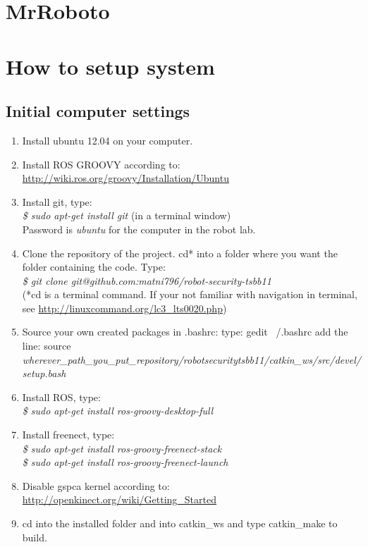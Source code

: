 \documentclass[10pt,a4paper]{article}
\begin{document}
\section*{MrRoboto}

\section{How to setup system}

\subsection{Initial computer settings}

\begin{enumerate}
\item Install ubuntu 12.04 on your computer.
\item Install ROS GROOVY according to: \url{http://wiki.ros.org/groovy/Installation/Ubuntu}
\item Install git, type:\\
\textit{
\$ sudo apt-get install git} (in a terminal window)\\
Password is \textit{ubuntu} for the computer in the robot lab.
\item Clone the repository of the project.
cd* into a folder where you want the folder containing the code.
Type:\\
\textit{\$ git clone git@github.com:matni796/robot-security-tsbb11}\\
(*cd is a terminal command. If your not familiar with navigation in terminal, see \url{http://linuxcommand.org/lc3\_lts0020.php})

\item Source your own created packages in .bashrc:
	type: gedit ~/.bashrc
add the line:
source \textit{wherever\_path\_you\_put\_repository/robot\-security\-tsbb11/catkin\_ws/src/devel/setup.bash}

\item Install ROS, type: \\
\textit{\$ sudo apt-get install ros-groovy-desktop-full}

\item Install freenect, type: \\
\textit{
\$ sudo apt-get install ros-groovy-freenect-stack\\
\$ sudo apt-get install ros-groovy-freenect-launch
}
\item Disable gspca kernel according to:
	\url{http://openkinect.org/wiki/Getting\_Started}


\item cd into the installed folder and into catkin\_ws and type catkin\_make to build.
\end{enumerate}
\end{document}
